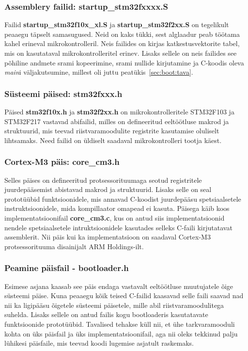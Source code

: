 \documentclass[12pt,a4paper]{article}
\begin{document}
\subsubsection{Assemblery failid: \textbf{startup\_stm32fxxxx.S}}
Failid \textbf{startup\_stm32f10x\_xl.S} ja \textbf{startup\_stm32f2xx.S} on
tegelikult peaaegu täpselt samasugused. Neid on kaks tükki, sest alglaadur peab
töötama kahel erineval mikrokontrolleril. Neis failides on kirjas
katkestusvektorite tabel, mis on kasutataval mikrokontrolleritel erinev. Lisaks
sellele on neis failides see põhiline andmete \gls{sram}i kopeerimine, \gls{sram}i nullide
kirjutamine ja C-koodis oleva \textit{main}i väljakutsumine, millest oli juttu
peatükis~\ref{sec:boot:tava}.

\subsubsection{Süsteemi päised: \textbf{stm32fxxx.h}}
Päised \textbf{stm32f10x.h} ja \textbf{stm32f2xx.h} on mikrokontrolleritele
STM32F103 ja STM32F217 vastavad abifailid, milles on defineeritud eeltöötluse
makrod ja struktuurid, mis teevad riistvaramoodulite registrite kasutamise
oluliselt lihtsamaks. Need failid on üldiselt saadaval mikrokontrolleri tootja
käest.

\subsubsection{Cortex-M3 päis: \textbf{core\_cm3.h}}
Selles päises on defineeritud protsessorituumaga seotud registritele
juurdepääsemist abistavad makrod ja struktuurid. Lisaks selle on seal
prototüübid funktsioonidele, mis annavad C-koodist juurdepääsu spetsiaalsetele
instruktsioonidele, mida kompillaator omapead ei kasuta. Päisega käib koos
implementatsioonifail \textbf{core\_cm3.c}, kus on antud siis implementatsioonid
nendele spetsiaalsetele intruktsioonidele kasutades selleks C-faili kirjutatavat
assemblerit. Nii päis kui ka implementatsioon on saadaval Cortex-M3
protsessorituuma disainijalt ARM Holdings-ilt.

\subsubsection{Peamine päisfail - \textbf{bootloader.h}}
Esimese asjana kaasab see päis endaga vastavalt eeltöötluse muutujatele õige
süsteemi päise. Kuna peaaegu kõik teised C-failid kaasavad selle faili saavad
nad nii ka ligipääsu õigetele süsteemi päisetele, mille abil
riistvaramoodulitega suhelda. Lisaks sellele on antud failis kogu bootloaderis
kasutatavate funktsioonide prototüübid. Tavalised tehakse küll nii, et ühe
tarkvaramooduli kohta on üks päisfail ja üks implementatsioonifail, aga nii
oleks tekkinud palju lühikesi päisfaile, mis teevad koodi lugemise asjatult
raskemaks.
\end{document}
